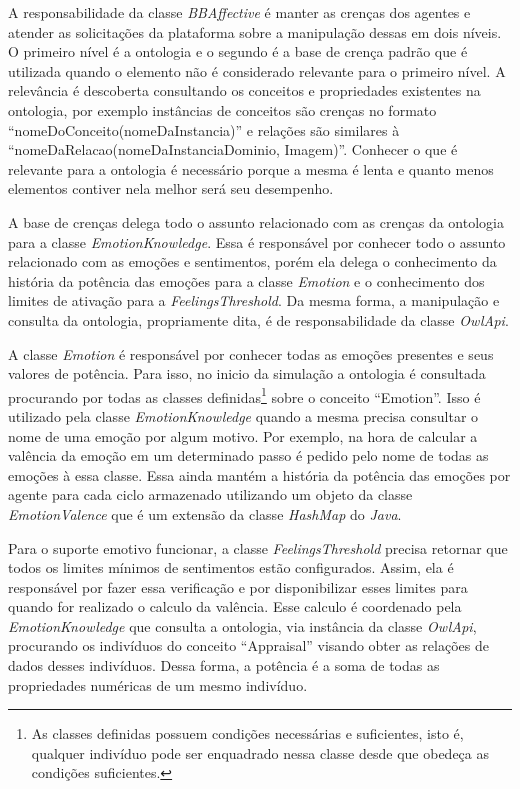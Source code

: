 A responsabilidade da classe \emph{BBAffective} é manter as crenças dos
agentes e atender as solicitações da plataforma \jason sobre a manipulação
dessas em dois níveis. O primeiro nível é a ontologia e o segundo é a base de
crença padrão que é utilizada quando o elemento não é considerado relevante
para o primeiro nível. A relevância é descoberta consultando os conceitos e
propriedades existentes na ontologia, por exemplo instâncias de conceitos são
crenças no formato ``nomeDoConceito(nomeDaInstancia)'' e relações são
similares à ``nomeDaRelacao(nomeDaInstanciaDominio, Imagem)''. Conhecer o que
é relevante para a ontologia é necessário porque a mesma é lenta e quanto
menos elementos contiver nela melhor será seu desempenho.

A base de crenças delega todo o assunto relacionado com as crenças da
ontologia para a classe \emph{EmotionKnowledge}. Essa é responsável por
conhecer todo o assunto relacionado com as emoções e sentimentos, porém ela
delega o conhecimento da história da potência das emoções para a classe
\emph{Emotion} e o conhecimento dos limites de ativação para a
\emph{FeelingsThreshold}. Da mesma forma, a manipulação e consulta da
ontologia, propriamente dita, é de responsabilidade da classe \emph{OwlApi}.

A classe \emph{Emotion} é responsável por conhecer todas as emoções presentes
e seus valores de potência. Para isso, no inicio da simulação a ontologia é
consultada procurando por todas as classes definidas\footnote{As classes
definidas possuem condições necessárias e suficientes, isto é, qualquer
indivíduo pode ser enquadrado nessa classe desde que obedeça as condições
suficientes.} sobre o conceito ``Emotion''. Isso é utilizado pela classe
\emph{EmotionKnowledge} quando a mesma precisa consultar o nome de uma emoção
por algum motivo. Por exemplo, na hora de calcular a valência da emoção em um
determinado passo é pedido pelo nome de todas as emoções à essa classe. Essa
ainda mantém a história da potência das emoções por agente para cada ciclo
armazenado utilizando um objeto da classe \emph{EmotionValence} que é um
extensão da classe \emph{HashMap} do \emph{Java}.

Para o suporte emotivo funcionar, a classe \emph{FeelingsThreshold} precisa
retornar que todos os limites mínimos de sentimentos estão configurados.
Assim, ela é responsável por fazer essa verificação e por disponibilizar esses
limites para quando for realizado o calculo da valência. Esse calculo é
coordenado pela \emph{EmotionKnowledge} que consulta a ontologia, via instância
da classe \emph{OwlApi}, procurando os indivíduos do conceito ``Appraisal''
visando obter as relações de dados desses indivíduos. Dessa forma, a potência
é a soma de todas as propriedades numéricas de um mesmo indivíduo.

